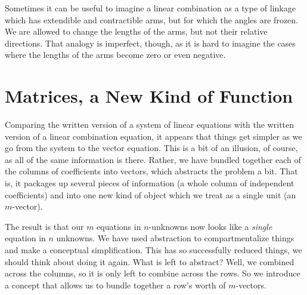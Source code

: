 \documentclass[00-livre-main.tex]{subfiles}
\begin{document}
Sometimes it can be useful to imagine a linear combination as a type of linkage which has extendible and contractible arms, but for which the angles are frozen. We are allowed to change the lengths of the arms, but not their relative directions. That analogy is imperfect, though, as it is hard to imagine the cases where the lengths of the arms become zero or even negative.


\section*{Matrices, a New Kind of Function}

Comparing the written version of a system of linear equations with the written version of a linear combination equation, it appears that things get simpler as we go from the system to the vector equation. This is a bit of an illusion, of course, as all of the same information is there. Rather, we have bundled together each of the columns of coefficients into vectors, which abstracts the problem a bit. That is, it packages up several pieces of information (a whole column of independent coefficients) and into one new kind of object which we treat as a single unit (an $m$-vector).

The result is that our $m$ equations in $n$-unknowns now looks like a \emph{single} equation in $n$ unknowns. We have used abstraction to compartmentalize things and make a conceptual simplification. This has so successfully reduced things, we should think about doing it again. What is left to abstract? Well, we combined across the columns, so it is only left to combine across the rows. So we introduce a concept that allows us to bundle together a row's worth of $m$-vectors.
\end{document}
